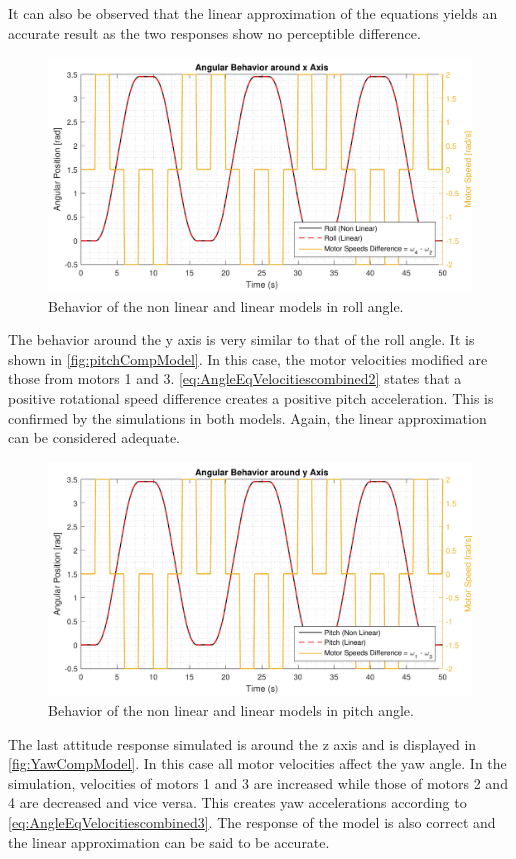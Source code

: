 It can also be observed that the linear approximation of the equations yields an accurate result as the two responses show no perceptible difference. 
%
\begin{figure}[H]
	\centering
	\includegraphics[scale=0.65]{figures/rollCompModel}
	\caption{Behavior of the non linear and linear models in roll angle.}
	\label{fig:rollCompModel}
\end{figure}
%
The behavior around the y axis is very similar to that of the roll angle. It is shown in \autoref{fig:pitchCompModel}. In this case, the motor velocities modified are those from motors 1 and 3. 
%
\autoref{eq:AngleEqVelocitiescombined2} states that a positive rotational speed difference creates a positive pitch acceleration. This is confirmed by the simulations in both models. Again, the linear approximation can be considered adequate.
\begin{figure}[H]
	\centering
	\includegraphics[scale=0.65]{figures/pitchCompModel}
	\caption{Behavior of the non linear and linear models in pitch angle.}
	\label{fig:pitchCompModel}
\end{figure}
%
The last attitude response simulated is around the z axis and is displayed in \autoref{fig:YawCompModel}. In this case all motor velocities affect the yaw angle. In the simulation, velocities of motors 1 and 3 are increased while those of motors 2 and 4 are decreased and vice versa. This creates yaw accelerations according to \autoref{eq:AngleEqVelocitiescombined3}. The response of the model is also correct and the linear approximation can be said to be accurate. 
